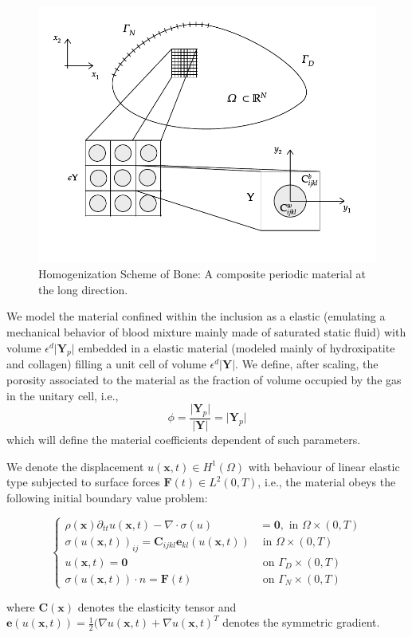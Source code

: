 \begin{figure}[!h]
	\centering
	\includegraphics[scale=.8]{images/HomSchemes/HomBasicScheme.pdf}
	\caption{Homogenization Scheme of Bone: A composite periodic material at the long direction.}
	\label{HomBasicScheme}
\end{figure}

\begin{rem}
We model the material confined within the inclusion as a elastic (emulating a mechanical behavior of blood mixture mainly made of saturated static fluid) with volume $\epsilon^d \vert \mathbf{Y}_p \vert$ embedded in a elastic material (modeled mainly of hydroxipatite and collagen) filling a unit cell of volume $\epsilon^d \vert \mathbf{Y} \vert$.
We define, after scaling, the porosity associated to the material as the fraction of volume occupied by the gas in the unitary cell, i.e., 
\begin{equation*}
\phi = \frac{\vert \mathbf{Y}_p \vert}{\vert \mathbf{Y} \vert} = \vert \mathbf{Y}_p \vert
\end{equation*}
which will define the material coefficients dependent of such parameters.
\end{rem}

We denote the displacement $u(\mathbf{x},t) \in H^1(\Omega)$ with behaviour of linear elastic type subjected to surface forces $\mathbf{F}(t) \in L^2 (0, T)$, i.e., the material obeys the following initial boundary value problem:

\begin{equation*}
    \left \{
    \begin{aligned}
        \rho (\mathbf{x}) \partial_{tt} u(\mathbf{x},t) - \nabla \cdot \sigma (u) & = \mathbf{0}, \text{ in } \Omega \times (0, T) \\
        \sigma(u(\mathbf{x},t))_{ij} = \mathbf{C}_{ijkl} \mathbf{e}_{kl}(u(\mathbf{x},t)) & \text{ in } \Omega \times (0, T) \\
        u(\mathbf{x},t) = \mathbf{0} & \text{ on } \Gamma_D \times (0, T) \\
    \sigma(u(\mathbf{x},t)) \cdot n = \mathbf{F}(t) & \text{ on } \Gamma_N \times (0,T)
    \end{aligned}
    \right .
\end{equation*}

where $\mathbf{C}(\mathbf{x})$ denotes the elasticity tensor and $\mathbf{e}(u(\mathbf{x},t)) = \frac{1}{2}\big( \nabla u(\mathbf{x},t) + \nabla u(\mathbf{x},t)^{T}$ denotes the symmetric gradient.


